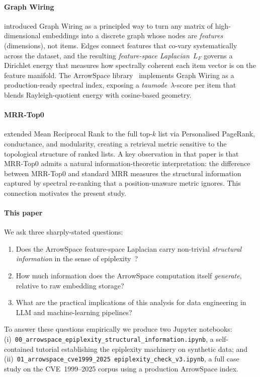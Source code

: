 \documentclass[12pt,a4paper]{article}
\theoremstyle{plain}
\theoremstyle{definition}
\theoremstyle{remark}
\newcommand{\1}{\mathbf{1}}
\begin{document}
	\paragraph{Graph Wiring}
	\cite{graphwiring2025} introduced Graph Wiring as a principled way to
	turn any matrix of high-dimensional embeddings into a discrete graph
	whose nodes are \emph{features} (dimensions), not items.
	Edges connect features that co-vary systematically across the dataset,
	and the resulting \emph{feature-space Laplacian}~$L_F$ governs a
	Dirichlet energy that measures how spectrally coherent each item vector
	is on the feature manifold.
	The ArrowSpace library~\citep{Moriondo2025ArrowSpace} implements Graph
	Wiring as a production-ready spectral index, exposing a
	\emph{taumode}~$\lambda$-score per item that blends Rayleigh-quotient
	energy with cosine-based geometry.
	
	\paragraph{MRR-Top0}
	\cite{mrrtop02025} extended Mean Reciprocal Rank to the full top-$k$
	list via Personalised PageRank, conductance, and modularity, creating a
	retrieval metric sensitive to the topological structure of ranked lists.
	A key observation in that paper is that MRR-Top0 admits a natural
	information-theoretic interpretation: the difference between
	MRR-Top0 and standard MRR measures the structural information captured
	by spectral re-ranking that a position-unaware metric ignores.
	This connection motivates the present study.
	
	\paragraph{This paper}
	We ask three sharply-stated questions:
	\begin{enumerate}
		\item Does the ArrowSpace feature-space Laplacian carry
		non-trivial \emph{structural information} in the sense of
		epiplexity~\citep{finzi2026epiplexity}?
		\item How much information does the ArrowSpace computation itself
		\emph{generate}, relative to raw embedding storage?
		\item What are the practical implications of this analysis for data
		engineering in LLM and machine-learning pipelines?
	\end{enumerate}
	To answer these questions empirically we produce two Jupyter notebooks:\\
	(i)~\texttt{00\_arrowspace\_epiplexity\_structural\_information.ipynb},
	a self-contained tutorial establishing the epiplexity machinery on
	synthetic data; and\\ (ii)~\texttt{01\_arrowspace\_cve1999\_2025\-%
		epiplexity\_check\_v3.ipynb}, a full case study on the CVE~1999--2025
	corpus using a production ArrowSpace index.
	
\end{document}
